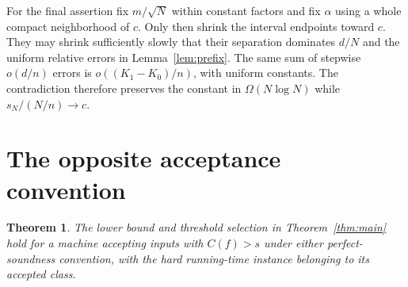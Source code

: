\documentclass[11pt]{article}
\newtheorem{theorem}{Theorem}
\begin{document}
For the final assertion fix $m/\sqrt N$ within constant factors and fix $\alpha$ using a whole compact neighborhood of $c$. Only then shrink the interval endpoints toward $c$. They may shrink sufficiently slowly that their separation dominates $d/N$ and the uniform relative errors in Lemma~\ref{lem:prefix}. The same sum of stepwise $o(d/n)$ errors is $o((K_1-K_0)/n)$, with uniform constants. The contradiction therefore preserves the constant in $\Omega(N\log N)$ while $s_N/(N/n)\to c$.

\section{The opposite acceptance convention}

\begin{theorem}\label{thm:reverse}
The lower bound and threshold selection in Theorem~\ref{thm:main} hold for a machine accepting inputs with $C(f)>s$ under either perfect-soundness convention, with the hard running-time instance belonging to its accepted class.
\end{theorem}
\end{document}

